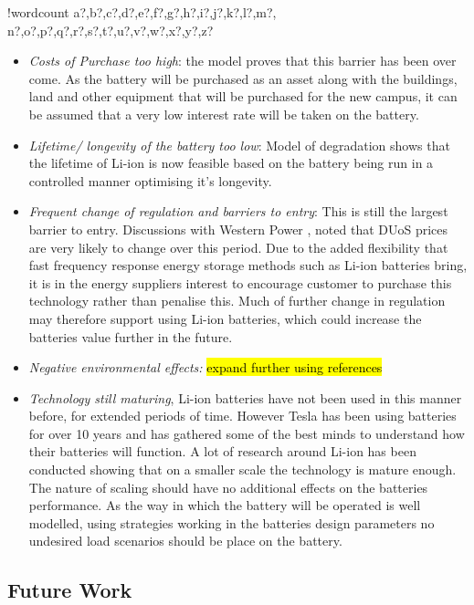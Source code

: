 \documentclass[fontsize=9.5pt]{extarticle}
\numberwithin{figure}{section} %
\providecommand{\tightlist}{%
  \setlength{\itemsep}{0pt}\setlength{\parskip}{0pt}}
\newcounter{words}
\newenvironment{counted}{%
  \setcounter{words}{0}
  \SearchList!{wordcount}{\stepcounter{words}}
    {a?,b?,c?,d?,e?,f?,g?,h?,i?,j?,k?,l?,m?,
    n?,o?,p?,q?,r?,s?,t?,u?,v?,w?,x?,y?,z?}
  \UndoBoundary{'}
  \SearchOrder{p;}}{%
  \StopSearching}
\begin{document}
\begin{counted}
\begin{itemize}
\tightlist
\item
  \emph{Costs of Purchase too high}: the model proves that this barrier
  has been over come. As the battery will be purchased as an asset along
  with the buildings, land and other equipment that will be purchased
  for the new campus, it can be assumed that a very low interest rate
  will be taken on the battery.
\item
  \emph{Lifetime/ longevity of the battery too low}: Model of
  degradation shows that the lifetime of Li-ion is now feasible based on
  the battery being run in a controlled manner optimising it's
  longevity.
\item
  \emph{Frequent change of regulation and barriers to entry}: This is
  still the largest barrier to entry. Discussions with Western Power
  \cite{wpMWMD}, noted that DUoS prices are very likely to change over
  this period. Due to the added flexibility that fast frequency response
  energy storage methods such as Li-ion batteries bring, it is in the
  energy suppliers interest to encourage customer to purchase this
  technology rather than penalise this. Much of further change in
  regulation may therefore support using Li-ion batteries, which could
  increase the batteries value further in the future.
\item
  \emph{Negative environmental effects:}
  \hl{expand further using references } \cite{daniels2013financial}
\item
  \emph{Technology still maturing}, Li-ion batteries have not been used
  in this manner before, for extended periods of time. However Tesla has
  been using batteries for over 10 years and has gathered some of the
  best minds to understand how their batteries will function. A lot of
  research around Li-ion has been conducted showing that on a smaller
  scale the technology is mature enough. The nature of scaling should
  have no additional effects on the batteries performance. As the way in
  which the battery will be operated is well modelled, using strategies
  working in the batteries design parameters no undesired load scenarios
  should be place on the battery.
\end{itemize}

\subsection{Future Work}\label{future-work}


\end{counted}
\end{document}
